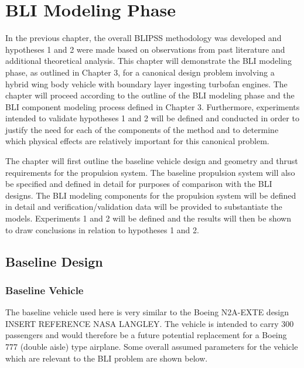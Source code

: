 \chapter{BLI Modeling Phase}
	In the previous chapter, the overall BLIPSS methodology was developed and hypotheses 1 and 2 were made based on observations from past literature and additional theoretical analysis.  This chapter will demonstrate the BLI modeling phase, as outlined in Chapter 3, for a canonical design problem involving a hybrid wing body vehicle with boundary layer ingesting turbofan engines.  The chapter will proceed according to the outline of the BLI modeling phase and the BLI component modeling process defined in Chapter 3.  Furthermore, experiments intended to validate hypotheses 1 and 2 will be defined and conducted in order to justify the need for each of the components of the method and to determine which physical effects are relatively important for this canonical problem.  
	
	The chapter will first outline the baseline vehicle design and geometry and thrust requirements for the propulsion system.  The baseline propulsion system will also be specified and defined in detail for purposes of comparison with the BLI designs.  The BLI modeling components for the propulsion system will be defined in detail and verification/validation data will be provided to substantiate the models.  Experiments 1 and 2 will be defined and the results will then be shown to draw conclusions in relation to hypotheses 1 and 2.  		
	
	\section{Baseline Design}
		\subsection{Baseline Vehicle}
			The baseline vehicle used here is very similar to the Boeing N2A-EXTE design INSERT REFERENCE NASA LANGLEY.  The vehicle is intended to carry 300 passengers and would therefore be a future potential replacement for a Boeing 777 (double aisle) type airplane.  Some overall assumed parameters for the vehicle which are relevant to the BLI problem are shown below.\\ 
			
